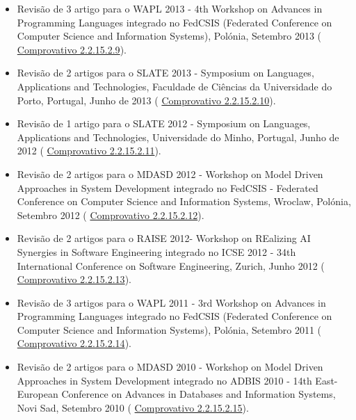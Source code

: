 \documentclass[11pt]{article}
\begin{document}
\begin{itemize}
\item{Revisão de 3 artigo para o WAPL 2013 - 4th Workshop on Advances in Programming Languages integrado no FedCSIS (Federated Conference on Computer Science and Information Systems), Polónia, Setembro 2013 (
\href{run:ComprovativosCOCP/revisoes/WAPL2013.pdf}{Comprovativo 2.2.15.2.9}).}
\item{Revisão de 2 artigos para o SLATE 2013 - Symposium on Languages, Applications and Technologies, Faculdade de Ciências da Universidade do Porto, Portugal, Junho de 2013 (
\href{run:ComprovativosCOCP/revisoes/SLATE2013.pdf}{Comprovativo 2.2.15.2.10}).}
\item{Revisão de 1 artigo para o SLATE 2012 - Symposium on Languages, Applications and Technologies, Universidade do Minho, Portugal, Junho de 2012 (
\href{run:ComprovativosCOCP/revisoes/SLATE2012.pdf}{Comprovativo 2.2.15.2.11}).}
\item{Revisão de 2 artigos para o MDASD 2012 - Workshop on Model Driven Approaches in System Development integrado no FedCSIS - Federated Conference on Computer Science and Information Systems, Wroclaw, Polónia, Setembro 2012 (
\href{run:ComprovativosCOCP/revisoes/MDASD2012.pdf}{Comprovativo 2.2.15.2.12}).}
\item{Revisão de 2 artigos para o RAISE 2012- Workshop on REalizing AI Synergies in Software Engineering integrado no ICSE 2012 - 34th International Conference on Software Engineering, Zurich, Junho 2012 (
\href{run:ComprovativosCOCP/revisoes/RAISE2012.pdf}{Comprovativo 2.2.15.2.13}).}
\item{Revisão de 3 artigos para o WAPL 2011 - 3rd Workshop on Advances in Programming Languages integrado no FedCSIS (Federated Conference on Computer Science and Information Systems), Polónia, Setembro 2011 (
\href{run:ComprovativosCOCP/revisoes/WAPL2011.pdf}{Comprovativo 2.2.15.2.14}).}
\item{Revisão de 2 artigos para o MDASD 2010 - Workshop on Model Driven Approaches in System Development integrado no ADBIS 2010 - 14th East-European Conference on Advances in Databases and Information Systems, Novi Sad, Setembro 2010 (
\href{run:ComprovativosCOCP/revisoes/MDASD2010.pdf}{Comprovativo 2.2.15.2.15}).}
\end{itemize}
 \\
\end{document}
